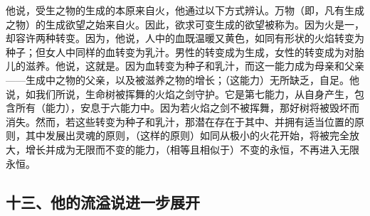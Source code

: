 他说，受生之物的生成的本原来自火，他通过以下方式辨认。万物（即，凡有生成之物）的生成欲望之始来自火。因此，欲求可变生成的欲望被称为。因为火是一，却容许两种转变。因为，他说，人中的血既温暖又黄色，如同有形状的火焰转变为种子；但女人中同样的血转变为乳汁。男性的转变成为生成，女性的转变成为对胎儿的滋养。他说，这就是。因为血转变为种子和乳汁，而这一能力成为母亲和父亲——生成中之物的父亲，以及被滋养之物的增长；（这能力）无所缺乏，自足。他说，如我们所说，生命树被挥舞的火焰之剑守护。它是第七能力，从自身产生，包含所有（能力），安息于六能力中。因为若火焰之剑不被挥舞，那好树将被毁坏而消失。然而，若这些转变为种子和乳汁，那潜在存在于其中、并拥有适当位置的原则，其中发展出灵魂的原则，（这样的原则）如同从极小的火花开始，将被完全放大，增长并成为无限而不变的能力，（相等且相似于）不变的永恒，不再进入无限永恒。\par


\subsection{十三、他的流溢说进一步展开}

